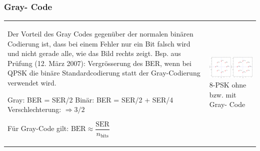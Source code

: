 \subsubsection{Gray- Code }
\begin{tabular}{ll}
	\parbox{8cm}{
		Der Vorteil des Gray Codes gegenüber der normalen binären Codierung ist, dass
		bei einem Fehler nur ein Bit falsch wird und nicht gerade alle, wie das Bild
		rechts zeigt.\\
        Bsp. aus Prüfung (12. März 2007): Vergrösserung des BER, wenn bei QPSK
        die binäre Standardcodierung statt der Gray-Codierung verwendet wird.
        
        Gray: BER = SER/2 \\
        Binär: BER = SER/2 + SER/4 \\
        Verschlechterung: $\Rightarrow 3/2$   \\ \\
        
        Für Gray-Code gilt: $\text{BER} \approx
        \dfrac{\text{SER}}{n_{\text{bits}}}$ } &\parbox{10cm}{
		\includegraphics[width=10cm]{./bilder/modulation_PSKmitGray.png}\\
		8-PSK ohne bzw. mit Gray- Code
	}
\end{tabular}

